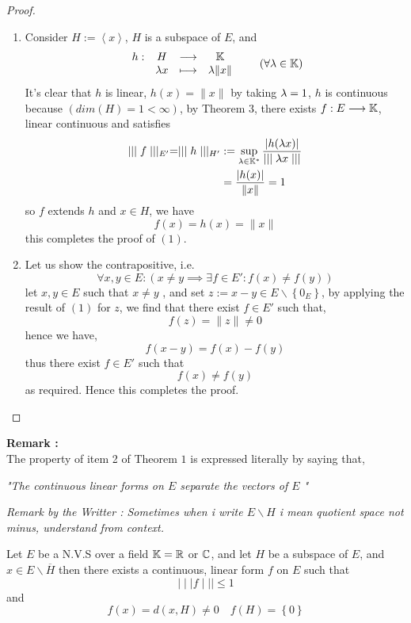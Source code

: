 \begin{proof}
	\begin{enumerate}[(1)]
\item 
Consider $H := \left\langle x \right\rangle $, $H $ is a subspace of $E $, and 
\[
\begin{array}{cccc}
      h : &  H  & \longrightarrow & \mathbb{K} \\

           &  \lambda x  & \longmapsto     & \lambda \| x \|  \\  
\end{array}
\quad \quad  (\forall  \lambda \in  \mathbb{K}) 
\]
It's clear that $h $ is linear, $h(x) = \| x \|$
by taking $\lambda = 1 $, $h $ is continuous because $( dim (H) = 1 < \infty )$,
by Theorem $3 $, there exists 
$ f : E \longrightarrow \mathbb{K} $, linear continuous and satisfies 
\begin{align*}
\mid \mid \mid  f \mid \mid \mid _{E'} = 
\mid \mid \mid  h \mid \mid \mid  _{H'} &:= 
\sup_{\lambda \in \mathbb{K}^{*}}  
\frac{\left| h(\lambda x)  \right|}{\mid \mid \mid  \lambda x \mid \mid \mid } \\
			&= 
\frac{\left| h(x)  \right|}{\| x \| } = 1 
\end{align*}
so $f $ extends $h $ and $x \in  H $, we have 
\[
f(x) = h(x)  = \| x \| 
\]
this completes the proof of $(1)$. 
\item Let us show the contrapositive, i.e. 
	\[
	\forall x,y \in  E: 
	\left( 
		x \neq  y \implies 
		\exists f \in  E' : f(x) \neq  f(y) 
	\right)
	\]
	let $x,y \in  E $  such that $x\neq y $ , and set 
	$z:= x-y \in E \backslash \left\{ 0_{E} \right\} $, 
	by applying the result of $(1)  $  for $z$, we find that 
	there exist $f \in  E' $  such that, 
	\[
	f(z)= \| z \|   \neq 0
	\]
	hence we have, 
	\[
	f(x-y)  = f(x)- f(y)  
	\]
	thus there exist $f \in  E' $  such that 
	\[
	f(x)\neq  f(y)  
	\]
	as required. Hence this completes the proof.
\end{enumerate}
\end{proof}
\divider
\textbf{Remark : } \\
The property of item 2 of Theorem $1 $ is expressed literally 
by saying that, 
\begin{center}
	\it "The continuous linear forms on $E $ separate the vectors of $E $ " 
	\normalfont
\end{center}
\divider
\it
Remark by the Writter : 
Sometimes when i write $E \backslash H$ i mean quotient 
space not minus, understand from context.
\normalfont
\begin{theorem}[Theorem 2]
	Let $E $ be a N.V.S over a field $\mathbb{K} = \mathbb{R} $  or $\mathbb{C}  $, and let 
	$H $ be a subspace of $E $, and $x \in  E \backslash \overline{H} $  
	then there exists a continuous, linear form $f$ on $E$ 
	such that 
	\[
	\mid \mid \mid  f \mid \mid \mid  \leq 1
	\]
	and 
	\[
	f(x)= d(x,H) \neq 0 \quad f(H) =  \left\{ 0 \right\}   
	\]
\end{theorem}
